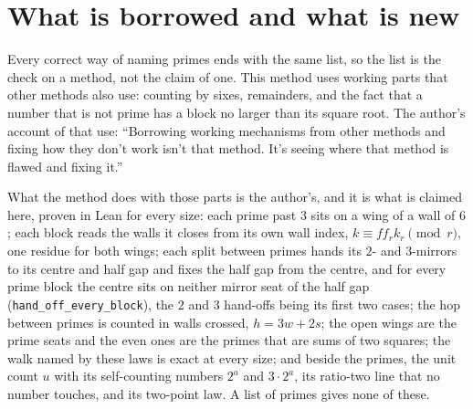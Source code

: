 \documentclass[11pt]{article}
\begin{document}
\section{What is borrowed and what is new}
Every correct way of naming primes ends with the same list, so the list is the check on a method, not the claim of one. This method uses working parts that other methods also use: counting by sixes, remainders, and the fact that a number that is not prime has a block no larger than its square root. The author's account of that use: ``Borrowing working mechanisms from other methods and fixing how they don't work isn't that method. It's seeing where that method is flawed and fixing it.''

What the method does with those parts is the author's, and it is what is claimed here, proven in Lean for every size: each prime past $3$ sits on a wing of a wall of $6$; each block reads the walls it closes from its own wall index, $k\equiv f f_r k_r \pmod r$, one residue for both wings; each split between primes hands its $2$- and $3$-mirrors to its centre and half gap and fixes the half gap from the centre, and for every prime block the centre sits on neither mirror seat of the half gap (\texttt{hand\_off\_every\_block}), the $2$ and $3$ hand-offs being its first two cases; the hop between primes is counted in walls crossed, $h = 3w+2s$; the open wings are the prime seats and the even ones are the primes that are sums of two squares; the walk named by these laws is exact at every size; and beside the primes, the unit count $u$ with its self-counting numbers $2^a$ and $3\cdot2^a$, its ratio-two line that no number touches, and its two-point law. A list of primes gives none of these.
\end{document}
